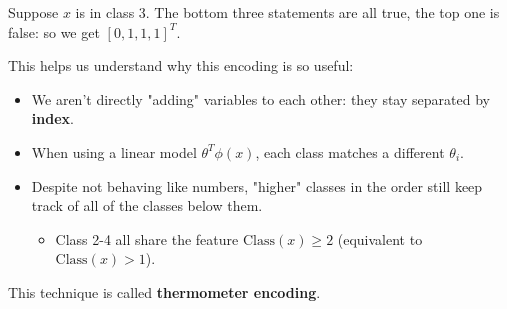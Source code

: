                 \miniex Suppose $x$ is in class 3. The bottom three statements are all true, the top one is false: so we get $[0, 1, 1, 1]^T$. 

                This helps us understand why this encoding is so useful:
                
                \begin{itemize}
                    \item We aren't directly "adding" variables to each other: they stay separated by \textbf{index}.
                    
                    \item When using a linear model $\theta^T\phi(x)$, each class  matches a different $\theta_i$.
                        
                    \item Despite not behaving like numbers, "higher" classes in the order still keep track of all of the classes below them.
                        \begin{itemize}
                            \item \miniex Class 2-4 all share the feature $\text{Class}(x)\geq 2$ (equivalent to $\text{Class}(x)>1$).
                        \end{itemize}
                \end{itemize}

                This technique is called \textbf{thermometer encoding}.\\

